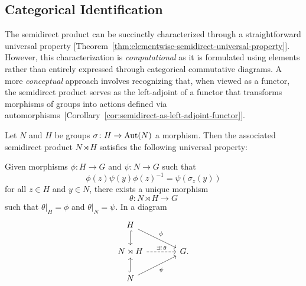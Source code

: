 \subsection*{Categorical Identification} The semidirect product can be succinctly characterized through a straightforward universal property [Theorem~\ref{thm:elementwise-semidirect-universal-property}]. However, this characterization is \textit{computational\/} as it is formulated using elements rather than entirely expressed through categorical commutative diagrams. A more \textit{conceptual\/} approach involves recognizing that, when viewed as a functor, the semidirect product serves as the left-adjoint of a functor that transforms morphisms of groups into actions defined via automorphisms~[Corollary~\ref{cor:semidirect-as-left-adjoint-functor}].

\begin{thm}\label{thm:elementwise-semidirect-universal-property}
    Let $N$ and $H$ be groups $\sigma\colon H\to{\rm Aut}(N)$ a morphism. Then the associated semidirect product $N\rtimes H$ satisfies the following universal property:

    Given morphisms $\phi\colon H\to G$ and $\psi\colon N\to G$ such that
    \begin{equation}\label{eq:elementwise-semidirect-universal-property}
        \phi(z)\psi(y)\phi(z)^{-1}=\psi(\sigma_z(y))
    \end{equation}
    for all $z\in H$ and $y\in N$, there exists a unique morphism
    $$
        \theta\colon N\rtimes H\to G
    $$
    such that $\theta|_H=\phi$ and $\theta|_N=\psi$. In a diagram
    $$
        \begin{tikzcd}[column sep=large]
            H
                    \arrow[d,hook]
                    \arrow[rd,"\phi"]\\
            N\rtimes H
                    \arrow[r,"\exists!\,\theta",dashed]
                &G.\\
            N
                    \arrow[u,hook]
                    \arrow[ru,"\psi"']
        \end{tikzcd}
    $$
\end{thm}

